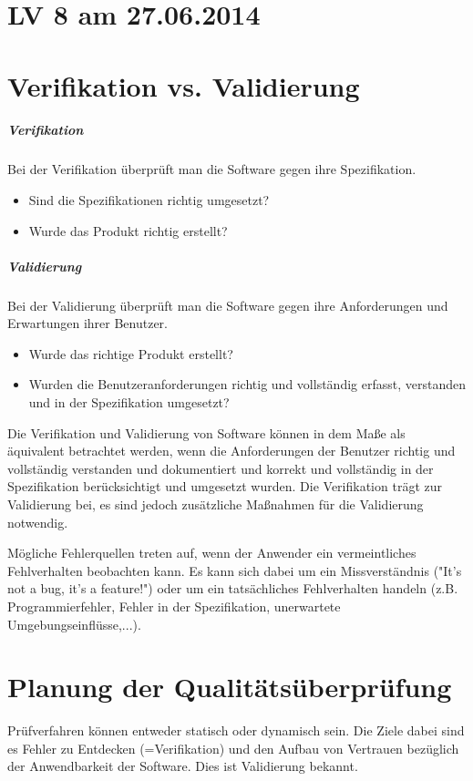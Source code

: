 \chapter{LV 8 am 27.06.2014}
\chapter{Verifikation vs. Validierung}
\paragraph{Verifikation}
Bei der Verifikation überprüft man die Software gegen ihre Spezifikation.
\begin{itemize}
\item Sind die Spezifikationen richtig umgesetzt?
\item Wurde das Produkt richtig erstellt?
\end{itemize}

\paragraph{Validierung}
Bei der Validierung überprüft man die Software gegen ihre Anforderungen und Erwartungen ihrer Benutzer.
\begin{itemize}
\item Wurde das richtige Produkt erstellt?
\item Wurden die Benutzeranforderungen richtig und vollständig erfasst, verstanden und in der Spezifikation umgesetzt?
\end{itemize}

Die Verifikation und Validierung von Software können in dem Maße als äquivalent betrachtet werden, wenn die Anforderungen der Benutzer richtig und vollständig verstanden und dokumentiert und korrekt und vollständig in der Spezifikation berücksichtigt und umgesetzt wurden.
Die Verifikation trägt zur Validierung bei, es sind jedoch zusätzliche Maßnahmen für die Validierung notwendig.

Mögliche Fehlerquellen treten auf, wenn der Anwender ein vermeintliches Fehlverhalten beobachten kann. Es kann sich dabei um ein Missverständnis ("It's not a bug, it's a feature!") oder um ein tatsächliches Fehlverhalten handeln (z.B. Programmierfehler, Fehler in der Spezifikation, unerwartete Umgebungseinflüsse,...).

\chapter{Planung der Qualitätsüberprüfung}
Prüfverfahren können entweder statisch oder dynamisch sein. Die Ziele dabei sind es Fehler zu Entdecken (=Verifikation) und den Aufbau von Vertrauen bezüglich der Anwendbarkeit der Software. Dies ist Validierung bekannt. 

